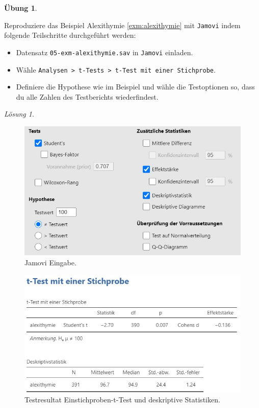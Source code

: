 \documentclass[
]{book}
\providecommand{\tightlist}{%
  \setlength{\itemsep}{0pt}\setlength{\parskip}{0pt}}
\theoremstyle{definition}
\theoremstyle{definition}
\theoremstyle{definition}
\newtheorem{exercise}{Übung}[chapter]
\theoremstyle{definition}
\theoremstyle{remark}
\newtheorem*{solution}{Lösung}
\begin{document}
\begin{exercise}
\protect\hypertarget{exr:alexithymie}{}\label{exr:alexithymie}\leavevmode

Reproduziere das Beispiel Alexithymie \ref{exm:alexithymie} mit \texttt{Jamovi} indem folgende Teilschritte durchgeführt werden:

\begin{itemize}
\tightlist
\item
  Datensatz \texttt{05-exm-alexithymie.sav} in \texttt{Jamovi} einladen.
\item
  Wähle \texttt{Analysen\ \textgreater{}\ t-Tests\ \textgreater{}\ t-Test\ mit\ einer\ Stichprobe}.
\item
  Definiere die Hypothese wie im Beispiel und wähle die Testoptionen so, dass du alle Zahlen des Testberichts wiederfindest.
\end{itemize}

\end{exercise}

\begin{solution}
\leavevmode

\begin{figure}
\includegraphics[width=1\linewidth]{figures/05-exr-alexithymie-jmv-input} \caption{Jamovi Eingabe.}\label{fig:sol-alexithymie-input}
\end{figure}

\begin{figure}
\includegraphics[width=1\linewidth]{figures/05-exr-alexithymie-jmv-output} \caption{Testresultat Einstichproben-t-Test und deskriptive Statistiken.}\label{fig:sol-alexithymie-output}
\end{figure}

\end{solution}
\end{document}
